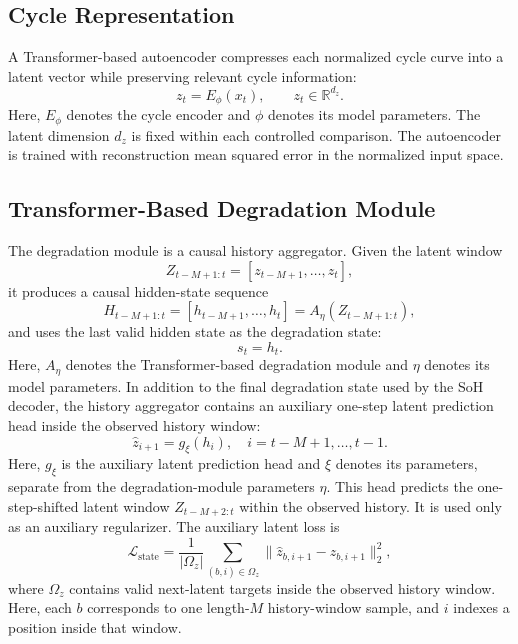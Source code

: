 \documentclass[conference]{IEEEtran}
\begin{document}
\subsection{Cycle Representation}

A Transformer-based autoencoder compresses each normalized cycle curve into
a latent vector while preserving relevant cycle information:
\begin{equation}
z_t = E_{\phi}(x_t), \qquad z_t \in \mathbb{R}^{d_z}.
\end{equation}
Here, $E_{\phi}$ denotes the cycle encoder and $\phi$ denotes its model
parameters.
The latent dimension $d_z$ is fixed within each controlled comparison. The
autoencoder is trained with reconstruction mean squared error in the normalized
input space.

\subsection{Transformer-Based Degradation Module}

The degradation module is a causal history aggregator. Given the latent
window
\begin{equation}
Z_{t-M+1:t} = [z_{t-M+1}, \ldots, z_t],
\end{equation}
it produces a causal hidden-state sequence
\begin{equation}
H_{t-M+1:t}
=
[h_{t-M+1}, \ldots, h_t]
=
A_{\eta}(Z_{t-M+1:t}),
\end{equation}
and uses the last valid hidden state as the degradation state:
\begin{equation}
s_t = h_t .
\end{equation}
Here, $A_{\eta}$ denotes the Transformer-based degradation module and $\eta$
denotes its model parameters. In addition to the final degradation state used by
the SoH decoder, the history aggregator contains an auxiliary one-step latent
prediction head inside the observed history window:
\begin{equation}
\hat z_{i+1}=g_{\xi}(h_i),
\quad i=t-M+1,\ldots,t-1 .
\end{equation}
Here, $g_{\xi}$ is the auxiliary latent prediction head and $\xi$ denotes its
parameters, separate from the degradation-module parameters $\eta$. This head
predicts the one-step-shifted latent window $Z_{t-M+2:t}$ within the observed
history. It is used only as an auxiliary regularizer.
The auxiliary latent loss is
\begin{equation}
\mathcal{L}_{\mathrm{state}}
=
\frac{1}{|\Omega_z|}
\sum_{(b,i)\in\Omega_z}
\|\hat z_{b,i+1}-z_{b,i+1}\|_2^2,
\end{equation}
where $\Omega_z$ contains valid next-latent targets inside the observed history
window. Here, each $b$ corresponds to one length-$M$ history-window sample, and
$i$ indexes a position inside that window.
\end{document}
